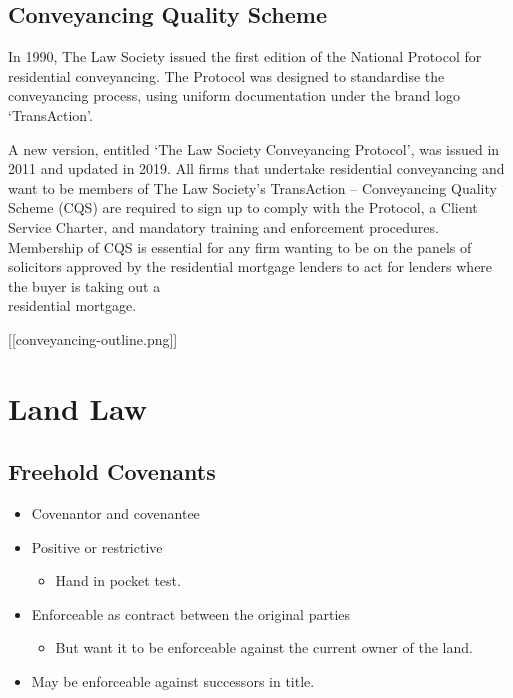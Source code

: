 \documentclass[
]{article}
\providecommand{\tightlist}{%
  \setlength{\itemsep}{0pt}\setlength{\parskip}{0pt}}
\begin{document}
\hypertarget{conveyancing-quality-scheme}{%
\subsection{Conveyancing Quality
Scheme}\label{conveyancing-quality-scheme}}

In 1990, The Law Society issued the first edition of the National
Protocol for residential conveyancing. The Protocol was designed to
standardise the conveyancing process, using uniform documentation under
the brand logo `TransAction'.

A new version, entitled `The Law Society Conveyancing Protocol', was
issued in 2011 and updated in 2019. All firms that undertake residential
conveyancing and want to be members of The Law Society's TransAction --
Conveyancing Quality Scheme (CQS) are required to sign up to comply with
the Protocol, a Client Service Charter, and mandatory training and
enforcement procedures. Membership of CQS is essential for any firm
wanting to be on the panels of solicitors approved by the residential
mortgage lenders to act for lenders where the buyer is taking out a\\
residential mortgage.

{[}{[}conveyancing-outline.png{]}{]}

\hypertarget{land-law}{%
\section{Land Law}\label{land-law}}

\hypertarget{freehold-covenants}{%
\subsection{Freehold Covenants}\label{freehold-covenants}}

\begin{itemize}
\tightlist
\item
  Covenantor and covenantee
\item
  Positive or restrictive

  \begin{itemize}
  \tightlist
  \item
    Hand in pocket test.
  \end{itemize}
\item
  Enforceable as contract between the original parties

  \begin{itemize}
  \tightlist
  \item
    But want it to be enforceable against the current owner of the land.
  \end{itemize}
\item
  May be enforceable against successors in title.
\end{itemize}
\end{document}
